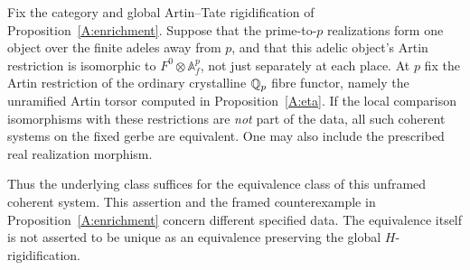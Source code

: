 \begin{proposition}
\label{A:unframed-adelic}
Fix the category and global Artin--Tate rigidification of
Proposition~\ref{A:enrichment}. Suppose that the prime-to-$p$
realizations form one object over the finite adeles away from $p$,
and that this adelic object's Artin restriction is isomorphic to
$F^0\otimes\mathbb A_f^p$, not just separately at each place. At $p$
fix the Artin restriction of the ordinary crystalline $\mathbb Q_p$
fibre functor, namely the unramified Artin torsor computed in
Proposition~\ref{A:eta}. If the local comparison isomorphisms with
these restrictions are \emph{not} part of the data, all such
coherent systems on the fixed gerbe are equivalent. One may also
include the prescribed real realization morphism.

Thus the underlying class suffices for the equivalence class of
this unframed coherent system. This assertion and the framed
counterexample in Proposition~\ref{A:enrichment} concern different
specified data. The equivalence itself is not asserted to be
unique as an equivalence preserving the global $H$-rigidification.
\end{proposition}
